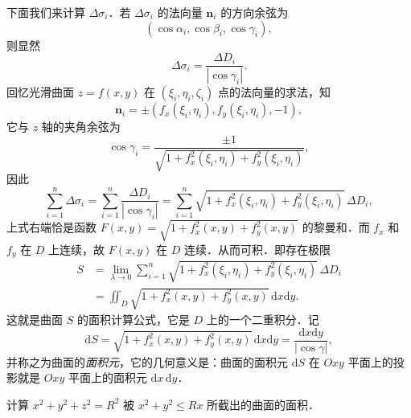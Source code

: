 下面我们来计算 $\Delta\sigma_{i}$．若 $\Delta\sigma_{i}$ 的法向量 $\bm{n}_{i}$ 的方向余弦为
\[
\left(\cos\alpha_{i},\cos\beta_{i},\cos\gamma_{i}\right),
\]
则显然
\[
\Delta\sigma_{i}=\frac{\Delta D_{i}}{\left|\cos\gamma_{i}\right|}.
\]
回忆光滑曲面 $z=f(x,y)$ 在 $(\xi_{i},\eta_{i},\zeta_{i})$ 点的法向量的求法，知
\[
\bm{n}_{i}=\pm\left(f_{x}(\xi_{i},\eta_{i}),f_{y}(\xi_{i},\eta_{i}),-1\right),
\]
它与 $z$ 轴的夹角余弦为
\[
\cos\gamma_{i}=\frac{\pm 1}{\sqrt{1+f_{x}^{2}(\xi_{i},\eta_{i})+f_{y}^{2}(\xi_{i},\eta_{i})}},
\]
因此
\[
\sum_{i=1}^{n}\Delta\sigma_{i}=\sum_{i=1}^{n}\frac{\Delta D_{i}}{\left|\cos\gamma_{i}\right|}=\sum_{i=1}^{n}\sqrt{1+f_{x}^{2}(\xi_{i},\eta_{i})+f_{y}^{2}(\xi_{i},\eta_{i})}\,\Delta D_{i},
\]
上式右端恰是函数 $F(x,y)=\sqrt{1+f_{x}^{2}(x,y)+f_{y}^{2}(x,y)}$ 的黎曼和．而 $f_{x}$ 和 $f_{y}$ 在 $D$ 上连续，故 $F(x,y)$ 在 $D$ 连续．从而可积．即存在极限
\[
\begin{aligned}
S&=\lim_{\lambda\to 0}\sum_{i=1}^{n}\sqrt{1+f_{x}^{2}(\xi_{i},\eta_{i})+f_{y}^{2}(\xi_{i},\eta_{i})}\,\Delta D_{i}\\
&=\iint_{D}\sqrt{1+f_{x}^{2}(x,y)+f_{y}^{2}(x,y)}\,\mathrm{d}x\mathrm{d}y.
\end{aligned}
\]
这就是曲面 $S$ 的面积计算公式，它是 $D$ 上的一个二重积分．记
\[
\mathrm{d}S=\sqrt{1+f_{x}^{2}(x,y)+f_{y}^{2}(x,y)}\,\mathrm{d}x\mathrm{d}y=\frac{\mathrm{d}x\mathrm{d}y}{\left|\cos\gamma\right|},
\]
并称之为曲面的\emph{面积元}，它的几何意义是：曲面的面积元 $\mathrm{d}S$ 在 $Oxy$ 平面上的投影就是 $Oxy$ 平面上的面积元 $\mathrm{d}x\,\mathrm{d}y$．

\begin{example}\label{ex:20-4-1}
计算 $x^{2}+y^{2}+z^{2}=R^{2}$ 被 $x^{2}+y^{2}\leqslant Rx$ 所截出的曲面的面积．
\end{example}

